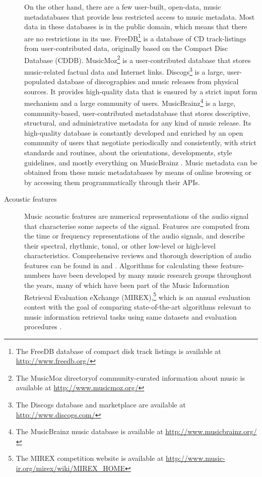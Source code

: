 \begin{description}
On the other hand, there are a few user-built, open-data, music metadataba\-ses that provide less restricted access to music metadata. Most data in these databa\-ses is in the public domain, which means that there are no restrictions in its use.
FreeDB\footnote{The FreeDB database of compact disk track listings is available at \url{http://www.freedb.org/}} is a database of CD track-listings from user-contributed data, originally based on the Compact Disc Database (CDDB).
MusicMoz\footnote{The MusicMoz directoryof community-curated information about music is available at \url{http://www.musicmoz.org/}} is a user-contributed database that stores music-related factual data and Internet links.
Discogs\footnote{The Discogs database and marketplace are available at \url{http://www.discogs.com/}} is a large, user-populat\-ed database of discographies and music releases from physical sources. It provides high-quality data that is ensured by a strict input form mechanism and a large community of users.
MusicBrainz\footnote{The MusicBrainz music database is available at \url{http://www.musicbrainz.org/}} is a large, community-based, user-con\-tributed metadatabase that stores descriptive, structural, and administrative metadata for any kind of music release. Its high-quality database is constantly developed and enriched by an open community of users that negotiate periodically and consistently, with strict standards and routines, about the orientations, developments, style guidelines, and mostly everything on MusicBrainz \autocite{hemerly11making}. 
Music metadata can be obtained from these music metadatabases by means of online browsing or by accessing them programmatically through their APIs.

\item [Acoustic features] Music acoustic features are numerical representations of the audio signal that characterise some aspects of the signal.
Features are computed from the time or frequency representations of the audio signals, and describe their spectral, rhythmic, tonal, or other low-level or high-level characteristics. 
Comprehensive reviews and thorough description of audio features can be found in \textcite{tzanetakis02manipulation} and \textcite{mckay10automatic}.
Algorithms for calculating these feature-numbers have been developed by many music research groups throughout the years, many of which have been part of the Music Information Retrieval Evaluation eXchange (MIREX),\footnote{The MIREX competition website is available at \url{http://www.music-ir.org/mirex/wiki/MIREX_HOME}} which is an annual evaluation contest with the goal of comparing state-of-the-art algorithms relevant to music information retrieval tasks using same datasets and evaluation procedures \autocite{downie08music}. 


\end{description}
